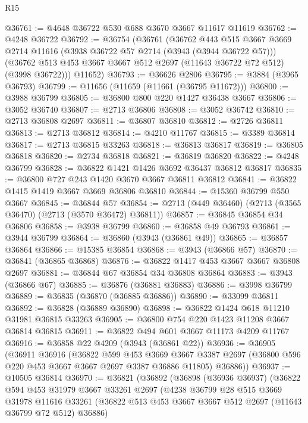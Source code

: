 \begin{lexlean}{R15}
\begin{coremodule}
@36761 := @4648 @36722 @530 @688 @3670 @3667 @11617 @11619
@36762 := @4248 @36722
@36792 := @36754
    (@36761
      (@36762
        @443
        @515
        @3667
        @3669
        @2714
        @11616
        (@3938 @36722 @57 @2714 (@3943 (@3944 @36722 @57)))
        (@36762 @513 @453 @3667 @3667 @512 @2697 (@11643 @36722 @72 @512) (@3998 @36722)))
      @11652)
@36793 := @36626 @2806
@36795 := @3884 (@3965 @36793)
@36799 := @11656 (@11659 (@11661 (@36795 @11672)))
@36800 := @3988 @36799
@36805 := @36800 @800 @220 @1427 @36438 @3667
@36806 := @3052 @36740
@36807 := @2713 @36806
@36808 := @3052 @36742
@36810 := @2713 @36808 @2697
@36811 := @36807 @36810
@36812 := @2726 @36811
@36813 := @2713 @36812
@36814 := @4210 @11767
@36815 := @3389 @36814
@36817 := @2713 @36815 @33263
@36818 := @36813 @36817
@36819 := @36805 @36818
@36820 := @2734 @36818
@36821 := @36819 @36820
@36822 := @4248 @36799
@36828 := @36822 @1421 @1426 @3692 @36437 @36812 @36817
@36835 := @36800 @727 @243 @1420 @3670 @3667 @36811 @36812
@36841 := @36822 @1415 @1419 @3667 @3669 @36806 @36810
@36844 := @15360 @36799 @550 @3667
@36845 := @36844 @57
@36854 := @2713 (@449 @36460) (@2713 (@3565 @36470) (@2713 (@3570 @36472) @36811))
@36857 := @36845 @36854 @34 @36806
@36858 := @3938 @36799
@36860 := @36858 @49 @36793
@36861 := @3944 @36799
@36864 := @36860 (@3943 (@36861 @49))
@36865 := @36857 @36864
@36866 := @15385 @36854
@36868 := @3943 (@36866 @57)
@36870 := @36841 (@36865 @36868)
@36876 := @36822 @1417 @453 @3667 @3667 @36808 @2697
@36881 := @36844 @67 @36854 @34 @36808 @36864
@36883 := @3943 (@36866 @67)
@36885 := @36876 (@36881 @36883)
@36886 := @3998 @36799
@36889 := @36835 (@36870 (@36885 @36886))
@36890 := @33099 @36811
@36892 := @36828 (@36889 @36890)
@36898 := @36822 @1424 @618 @11210 @31981 @36815 @33263
@36905 := @36800 @754 @220 @1423 @11208 @3667 @36814 @36815
@36911 := @36822 @494 @601 @3667 @11173 @4209 @11767
@36916 := @36858 @22 @4209 (@3943 (@36861 @22))
@36936 := @36905
    (@36911
      @36916
      (@36822
        @599
        @453
        @3669
        @3667
        @3387
        @2697
        (@36800 @596 @220 @453 @3667 @3667 @2697 @3387 @36886 @11805)
        @36886))
@36937 := @10505 @36814
@36970 := @36821
    (@36892
      (@36898
        (@36936 @36937)
        (@36822
          @594
          @453
          @31979
          @3667
          @33261
          @2697
          (@4238
            @36799
            @28
            @515
            @3669
            @31978
            @11616
            @33261
            (@36822 @513 @453 @3667 @3667 @512 @2697 (@11643 @36799 @72 @512) @36886)

\end{coremodule}
\end{lexlean}
